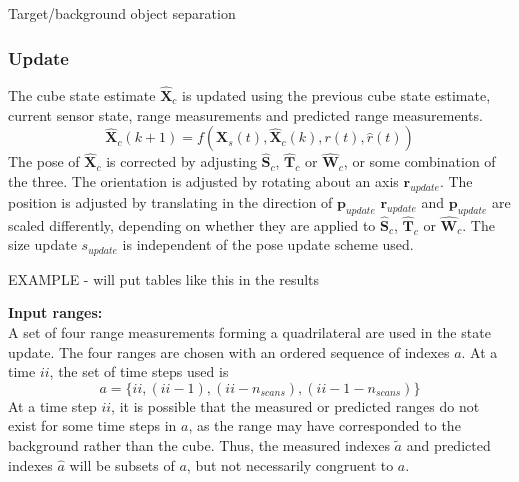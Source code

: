 		\IncMargin{2em}
		\begin{algorithm}
		\DontPrintSemicolon
	
		\caption{Target/background object separation} \label{alg:object}
		\end{algorithm}
		
	\subsubsection{Update} 
		The cube state estimate $\hat{\mathbf{X}}_c$ is updated using the previous cube state estimate, current sensor state, range measurements and predicted range measurements. 
		\begin{equation}
			\hat{\mathbf{X}}_{c}(k+1) = f(\mathbf{X}_{s}(t),\hat{\mathbf{X}}_{c}(k),r(t),\hat{r}(t))
		\end{equation}	
		The pose of $\hat{\mathbf{X}}_c$ is corrected by adjusting $\hat{\mathbf{S}}_c$, $\hat{\mathbf{T}}_c$ or $\hat{\mathbf{W}}_c$, or some combination of the three.
		The orientation is adjusted by rotating  about an axis $\mathbf{r}_{update}$. The position is adjusted by translating in the direction of $\mathbf{p}_{update}$
		$\mathbf{r}_{update}$ and $\mathbf{p}_{update}$ are scaled differently, depending on whether they are applied to $\hat{\mathbf{S}}_c$, $\hat{\mathbf{T}}_c$ or $\hat{\mathbf{W}}_c$.
		The size update $s_{update}$ is independent of the pose update scheme used.

		EXAMPLE - will put tables like this in the results
		
		
		\textbf{Input ranges:}\\
			A set of four range measurements forming a quadrilateral are used in the state update. The four ranges are chosen with an ordered sequence of indexes $a$. At a time $ii$, the set of time steps used is
			\begin{equation}
				a = \{ii,(ii-1),(ii-n_{scans}),(ii-1-n_{scans})\}
			\end{equation}
			At a time step $ii$, it is possible that the measured or predicted ranges do not exist for some time steps in $a$, as the range may have corresponded to the background rather than the cube.
			Thus, the measured indexes $\tilde{a}$ and predicted indexes $\hat{a}$ will be subsets of $a$, but not necessarily congruent to $a$.
			
